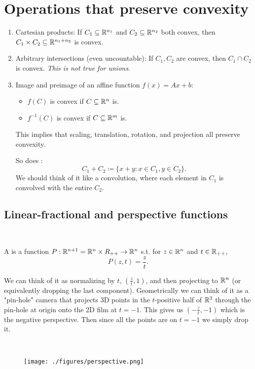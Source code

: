 \documentclass[class=article,crop=false]{standalone}
\begin{document}
\section{Operations that preserve convexity}
\begin{enumerate}[label=\arabic*)]
	\item Cartesian products: If $ C_1 \subseteq \mathbb{R}^{n_1}$ and $ C_2 \subseteq \mathbb{R}^{n_2}$ both convex, then $ C_1 \times C_2 \subseteq \mathbb{R}^{n_1 + n_2}$ is convex.
	\item Arbitrary intersections (even uncountable): If $ C_1, C_2$ are convex, then $ C_1 \cap C_2$ is convex. \emph{This is not true for unions}.
	\item Image and preimage of an affine function $ f(x) = Ax+b$: 
		 \begin{itemize}
			 \item $ f(C)$ is convex if  $ C \subseteq \mathbb{R}^{n}$ is.
			 \item  $ f^{-1}(C)$ is convex if $ C \subseteq \mathbb{R}^{m}$ is.
		\end{itemize}
		This implies that scaling, translation, rotation, and projection all preserve convexity.

		So does :
		\[
		C_1+C_2 \coloneqq \{x+y : x \in C_1, y \in C_2\} 
		.\] 
		We should think of it like a convolution, where each element in $ C_1$ is convolved with the entire $ C_2$.
\end{enumerate}

\subsection{Linear-fractional and perspective functions}
~\begin{defn}
A  is a function $ P: \mathbb{R}^{n+1} = \mathbb{R}^{n}\times R_{++} \to \mathbb{R}^{n}$ s.t. for $ z \in \mathbb{R}^{n}$ and $ t \in \mathbb{R}_{++}$,
\[
	P(z, t) = \frac{z}{t}
.\] 
\end{defn}
\begin{intuition}
	We can think of it as normalizing by $ t$, $ (\frac{z}{t},1)$, and then projecting to  $ \mathbb{R}^{n}$ (or equivalently dropping the last component). Geometrically we can think of it as a "pin-hole" camera that projects 3D points in the $ t$-positive half of $ \mathbb{R}^{3}$ through the pin-hole at origin onto the 2D film at $ t=-1$. This gives us $ (-\frac{z}{t},-1)$ which is the negative perspective. Then since all the points are on $ t=-1$ we simply drop it.
\end{intuition}
~\begin{figure}[H]
	\centering
	\texttt{[image: ./figures/perspective.png]}
\end{figure}
\end{document}
